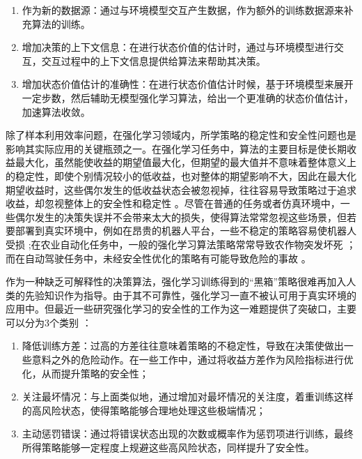 \begin{enumerate}[1)]
    \item 作为新的数据源：通过与环境模型交互产生数据，作为额外的训练数据源来补充算法的训练。
    \item 增加决策的上下文信息：在进行状态价值的估计时，通过与环境模型进行交互，交互过程中的上下文信息提供给算法来帮助其决策。
    \item 增加状态价值估计的准确性：在进行状态价值估计时候，基于环境模型来展开一定步数，然后辅助无模型强化学习算法，给出一个更准确的状态价值估计，加速算法收敛。
\end{enumerate}

除了样本利用效率问题，在强化学习领域内，所学策略的稳定性和安全性问题也是影响其实际应用的关键瓶颈之一\cite{junges2016safety}。在强化学习任务中，算法的主要目标是使长期收益最大化，虽然能使收益的期望值最大化，但期望的最大值并不意味着整体意义上的稳定性，即使个别情况较小的低收益，也对整体的期望影响不大，因此在最大化期望收益时，这些偶尔发生的低收益状态会被忽视掉，往往容易导致策略过于追求收益，却忽视整体上的安全性和稳定性 \cite{garcia2015comprehensive,xiong2016combining}。尽管在普通的任务或者仿真环境中，一些偶尔发生的决策失误并不会带来太大的损失，使得算法常常忽视这些场景，但若要部署到真实环境中，例如在昂贵的机器人平台，一些不稳定的策略容易使机器人受损 \cite{kormushev2010robot};在农业自动化任务中，一般的强化学习算法策略常常导致农作物突发坏死 \cite{bu2019smart}；而在自动驾驶任务中，未经安全性优化的策略有可能导致危险的事故 \cite{sallab2017deep,ferdowsi2018robust}。

作为一种缺乏可解释性的决策算法，强化学习训练得到的“黑箱”策略很难再加入人类的先验知识作为指导\cite{mousavi2020black,wei2021non}。由于其不可靠性，强化学习一直不被认可用于真实环境的应用中\cite{berkenkamp2017safe,jin2020stability}。但最近一些研究强化学习的安全性的工作为这一难题提供了突破口，主要可以分为3个类别 \cite{munos2016safe}：

\begin{enumerate}[1)]
    \item 降低训练方差：过高的方差往往意味着策略的不稳定性，导致在决策使做出一些意料之外的危险动作。在一些工作中，通过将收益方差作为风险指标进行优化，从而提升策略的安全性；
    \item 关注最坏情况：与上面类似地，通过增加对最坏情况的关注度，着重训练这样的高风险状态，使得策略能够合理地处理这些极端情况；
    \item 主动惩罚错误：通过将错误状态出现的次数或概率作为惩罚项进行训练，最终所得策略能够一定程度上规避这些高风险状态，同样提升了安全性。
\end{enumerate}

